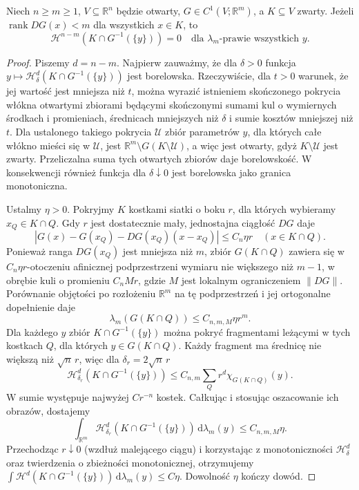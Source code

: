 \begin{lemat}
\label{lem:critical-coarea-null-28}
Niech $n\ge m\ge1$, $V\subseteq\mathbb R^n$
będzie otwarty, $G\in C^1(V;\mathbb R^m)$,
a $K\subseteq V$ zwarty. Jeżeli
$\operatorname{rank}DG(x)<m$ dla wszystkich $x\in K$,
to
\[
 \mathcal H^{n-m}(K\cap G^{-1}(\{y\}))=0
 \quad\text{dla }\lambda_m\text{-prawie wszystkich }y.
\]
\end{lemat}
\begin{proof}
Piszemy $d=n-m$. Najpierw zauważmy, że dla
$\delta>0$ funkcja
$y\mapsto\mathcal H^d_\delta(K\cap G^{-1}(\{y\}))$
jest borelowska. Rzeczywiście, dla $t>0$ warunek,
że jej wartość jest mniejsza niż $t$, można
wyrazić istnieniem skończonego pokrycia włókna
otwartymi zbiorami będącymi skończonymi
sumami kul o wymiernych środkach i promieniach,
średnicach mniejszych niż $\delta$ i sumie kosztów
mniejszej niż $t$. Dla ustalonego takiego pokrycia
$\mathcal U$ zbiór parametrów $y$, dla których
całe włókno mieści się w $\mathcal U$, jest
$\mathbb R^m\setminus G(K\setminus\mathcal U)$,
a więc jest otwarty, gdyż $K\setminus\mathcal U$
jest zwarty. Przeliczalna suma tych otwartych
zbiorów daje borelowskość. W konsekwencji
również funkcja dla $\delta\downarrow0$ jest
borelowska jako granica monotoniczna.

Ustalmy $\eta>0$. Pokryjmy $K$ kostkami siatki
o boku $r$, dla których wybieramy
$x_Q\in K\cap Q$. Gdy $r$ jest dostatecznie
mały, jednostajna ciągłość $DG$ daje
\[
 |G(x)-G(x_Q)-DG(x_Q)(x-x_Q)|\le C_n\eta r
 \quad(x\in K\cap Q).
\]
Ponieważ ranga $DG(x_Q)$ jest mniejsza niż $m$,
zbiór $G(K\cap Q)$ zawiera się w
$C_n\eta r$-otoczeniu afinicznej podprzestrzeni
wymiaru nie większego niż $m-1$, w obrębie
kuli o promieniu $C_nMr$, gdzie $M$ jest
lokalnym ograniczeniem $\|DG\|$.
Porównanie objętości po rozłożeniu
$\mathbb R^m$ na tę podprzestrzeń i jej
ortogonalne dopełnienie daje
\[
 \lambda_m(G(K\cap Q))\le C_{n,m,M}\eta r^m.
\]
Dla każdego $y$ zbiór $K\cap G^{-1}(\{y\})$
można pokryć fragmentami leżącymi w tych
kostkach $Q$, dla których $y\in G(K\cap Q)$.
Każdy fragment ma średnicę nie większą niż
$\sqrt n\,r$, więc dla $\delta_r=2\sqrt n\,r$
\[
 \mathcal H^d_{\delta_r}(K\cap G^{-1}(\{y\}))
 \le C_{n,m}\sum_Q r^d\chi_{G(K\cap Q)}(y).
\]
W sumie występuje najwyżej $Cr^{-n}$ kostek.
Całkując i stosując oszacowanie ich obrazów,
dostajemy
\[
 \int_{\mathbb R^m}\mathcal H^d_{\delta_r}
 (K\cap G^{-1}(\{y\}))\,\mathrm d\lambda_m(y)
 \le C_{n,m,M}\eta.
\]
Przechodząc $r\downarrow0$ (wzdłuż malejącego
ciągu) i korzystając z monotoniczności
$\mathcal H^d_\delta$ oraz twierdzenia o
zbieżności monotonicznej, otrzymujemy
$\int\mathcal H^d(K\cap G^{-1}(\{y\}))
\,\mathrm d\lambda_m(y)\le C\eta$.
Dowolność $\eta$ kończy dowód.
\end{proof}


